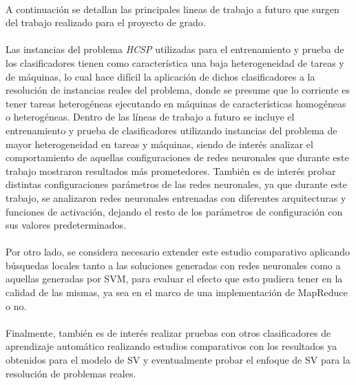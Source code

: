 \paragraph{}A continuación se detallan las principales lineas de trabajo a futuro que surgen del trabajo realizado para el proyecto de grado.

\paragraph{}Las instancias del problema \textit{HCSP} utilizadas para el entrenamiento y prueba de los clasificadores tienen como característica una baja heterogeneidad de tareas y de máquinas, lo cual hace difícil la aplicación de dichos clasificadores a la resolución de instancias reales del problema, donde se presume que lo corriente es tener tareas heterogéneas ejecutando en máquinas de características homogéneas o heterogéneas.
Dentro de las líneas de trabajo a futuro se incluye el entrenamiento y prueba de clasificadores utilizando instancias del problema de mayor heterogeneidad en tareas y máquinas, siendo de interés analizar el comportamiento de aquellas configuraciones de redes neuronales que durante este trabajo mostraron resultados más prometedores.
También es de interés probar distintas configuraciones parámetros de las redes neuronales, ya que durante este trabajo, se analizaron redes neuronales entrenadas con diferentes arquitecturas y funciones de activación, dejando el resto de los parámetros de configuración con sus valores predeterminados. 

\paragraph{}Por otro lado, se considera necesario extender este estudio comparativo aplicando búsquedas locales tanto a las soluciones generadas con redes neuronales como a aquellas generadas por SVM, para evaluar el efecto que esto pudiera tener en la calidad de las mismas, ya sea en el marco de una implementación de MapReduce o no.

\paragraph{}Finalmente, también es de interés realizar pruebas con otros clasificadores de aprendizaje automático realizando estudios comparativos con los resultados ya obtenidos para el modelo de SV y eventualmente probar el enfoque de SV para la resolución de problemas reales.
